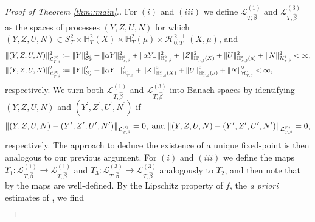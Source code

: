 \documentclass[10pt]{article} %
\newcommand\cH{\mathcal H}
\newcommand\cL{\mathcal L}
\newcommand\cS{\mathcal S}
\newcommand{\smalltext}[1]{\text{\fontsize{4}{4}\selectfont$#1$}}
\def \H{\mathbb{H}}
\newcommand{\1}{\mathbf{1}}
\begin{document}
\begin{proof}[Proof of Theorem \ref{thm::main}.]
	\medskip
	For $(i)$ and $(iii)$ we define $\cL^{(1)}_{T,\hat\beta}$ and $\cL^{(3)}_{T,\hat\beta}$ as the spaces of processes $(Y,Z,U,N)$ for which $(Y,Z,U,N) \in  \cS^2_T \times \H^2_T(X) \times \H^2_T(\mu) \times \cH^{2,\perp}_{0,T}(X,\mu)$, and
	\begin{align*}
		\|(Y,Z,U,N)\|^2_{\cL^\smalltext{(1)}_{\smalltext{T}\smalltext{,}\smalltext{\hat\beta}}} &\coloneqq \|Y\|^2_{\cS^\smalltext{2}_\smalltext{T}} + \|\alpha Y\|^2_{\H^\smalltext{2}_{\smalltext{T}\smalltext{,}\smalltext{\hat\beta}}} + \|\alpha Y_-\|^2_{\H^\smalltext{2}_{\smalltext{T}\smalltext{,}\smalltext{\hat\beta}}} + \|Z\|^2_{\H^\smalltext{2}_{\smalltext{T}\smalltext{,}\smalltext{\hat\beta}}(X)} + \|U\|^2_{\H^\smalltext{2}_{\smalltext{T}\smalltext{,}\smalltext{\hat\beta}}(\mu)} + \|N\|^2_{\cH^\smalltext{2}_{\smalltext{T}\smalltext{,}\smalltext{\hat\beta}}} < \infty,\\
		\|(Y,Z,U,N)\|^2_{\cL^\smalltext{(3)}_{\smalltext{T}\smalltext{,}\smalltext{\hat\beta}}} &\coloneqq \|Y\|^2_{\cS^\smalltext{2}_\smalltext{T}} + \|\alpha Y_-\|^2_{\H^\smalltext{2}_{\smalltext{T}\smalltext{,}\smalltext{\hat\beta}}} + \|Z\|^2_{\H^\smalltext{2}_{\smalltext{T}\smalltext{,}\smalltext{\hat\beta}}(X)} + \|U\|^2_{\H^\smalltext{2}_{\smalltext{T}\smalltext{,}\smalltext{\hat\beta}}(\mu)} + \|N\|^2_{\cH^\smalltext{2}_{\smalltext{T}\smalltext{,}\smalltext{\hat\beta}}} < \infty,
	\end{align*}
	respectively. We turn both $\cL^{(1)}_{T,\hat\beta}$ and $\cL^{(3)}_{T,\hat\beta}$ into Banach spaces by identifying $(Y,Z,U,N)$ and $(Y^\prime,Z^\prime,U^\prime,N^\prime)$ if 
	\begin{equation*}
		\|(Y,Z,U,N) - (Y^\prime,Z^\prime,U^\prime,N^\prime)\|_{\cL^\smalltext{(1)}_{\smalltext{T}\smalltext{,}\smalltext{\hat\beta}}} = 0, \; \text{and} \; \|(Y,Z,U,N) - (Y^\prime,Z^\prime,U^\prime,N^\prime)\|_{\cL^\smalltext{(3)}_{\smalltext{T}\smalltext{,}\smalltext{\hat\beta}}} = 0,
	\end{equation*}
	respectively. The approach to deduce the existence of a unique fixed-point is then analogous to our previous argument. For $(i)$ and $(iii)$ we define the maps $\Upsilon_1 : \cL^{(1)}_{T,\hat\beta} \longrightarrow \cL^{(1)}_{T,\hat\beta}$ and $\Upsilon_3 : \cL^{(3)}_{T,\hat\beta} \longrightarrow \cL^{(3)}_{T,\hat\beta}$ analogously to $\Upsilon_2$, and then note that by  the maps are well-defined. By the Lipschitz property of $f$, the \emph{a priori} estimates of , we find
	\begin{align*}

\end{align*}
\end{proof}
\end{document}
